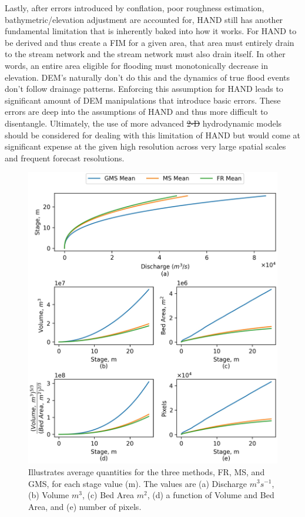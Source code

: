 \documentclass[draft]{dependencies/agujournal2019}
\providecommand{\DIFadd}[1]{{\protect\color{blue}\uwave{#1}}} %
\providecommand{\DIFdel}[1]{{\protect\color{red}\sout{#1}}}                      %
\providecommand{\DIFaddbegin}{} %
\providecommand{\DIFaddend}{} %
\providecommand{\DIFdelbegin}{} %
\providecommand{\DIFdelend}{} %
\providecommand{\DIFaddbeginFL}{} %
\providecommand{\DIFaddendFL}{} %
\providecommand{\DIFdelendFL}{} %
\begin{document}
Lastly, after errors introduced by conflation, poor roughness estimation, bathymetric/elevation adjustment are accounted for, HAND still has another fundamental limitation that is inherently baked into how it works.
For HAND to be derived and thus create a FIM for a given area, that area must entirely drain to the stream network and the stream network must also drain itself.
In other words, an entire area eligible for flooding must monotonically decrease in elevation. 
DEM's naturally don't do this and the dynamics of true flood events don't follow drainage patterns.
Enforcing this assumption for HAND leads to significant amount of DEM manipulations that introduce basic errors.
These errors are deep into the assumptions of HAND and thus more difficult to disentangle.
Ultimately, the use of more advanced \DIFdelbegin \DIFdel{2-D }\DIFdelend \DIFaddbegin \DIFadd{2D }\DIFaddend hydrodynamic models should be considered for dealing with this limitation of HAND but would come at significant expense at the given high resolution across very large spatial scales and frequent forecast resolutions.
%
\DIFdelbegin %
\DIFdelendFL \DIFaddbeginFL \begin{figure}[H]
\DIFaddendFL \centering
\includegraphics[scale=1.0]{figures/rating_curve_comparison.jpg}
\caption{Illustrates average quantities for the three methods, FR, MS, and GMS, for each stage value (m). 
The values are (a) Discharge $m^3s^{-1}$, (b) Volume $m^3$, (c) Bed Area $m^2$, (d) a function of Volume and Bed Area, and (e) number of pixels.
}
\label{fig:rating_curve_comparison}
\end{figure}
\end{document}
